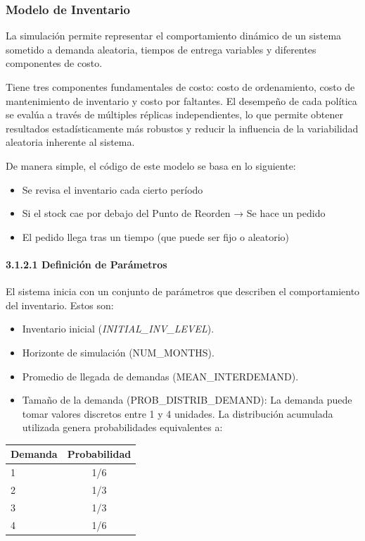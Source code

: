 \documentclass{article}
\begin{document}
\subsubsection{Modelo de Inventario}
La simulación permite representar el comportamiento dinámico de un sistema sometido a demanda aleatoria, tiempos de entrega variables y diferentes componentes de costo.

Tiene tres componentes fundamentales de costo: costo de ordenamiento, costo de mantenimiento de inventario y costo por faltantes. El desempeño de cada política se evalúa a través de múltiples réplicas independientes, lo que permite obtener resultados estadísticamente más robustos y reducir la influencia de la variabilidad aleatoria inherente al sistema.

De manera simple, el código de este modelo se basa en lo siguiente:
\begin{itemize}
    \item Se revisa el inventario cada cierto período
    \item Si el stock cae por debajo del Punto de Reorden → Se hace un pedido
    \item El pedido llega tras un tiempo (que puede ser fijo o aleatorio)
\end{itemize}

\paragraph{3.1.2.1 Definición de Parámetros}
El sistema inicia con un conjunto de parámetros que describen el comportamiento del inventario. Estos son:
\begin{itemize}
    \item Inventario inicial (\textit{INITIAL\_INV\_LEVEL}).
    \item Horizonte de simulación (NUM\_MONTHS).
    \item Promedio de llegada de demandas (MEAN\_INTERDEMAND).
    \item Tamaño de la demanda (PROB\_DISTRIB\_DEMAND): La demanda puede tomar valores discretos entre 1 y 4 unidades. La distribución acumulada utilizada genera probabilidades equivalentes a:
\end{itemize}

\begin{table}[h]
\centering
\begin{tabular}{|l|c|}
\hline
\textbf{Demanda} & \textbf{Probabilidad} \\ \hline
1 & 1/6 \\ \hline
2 & 1/3 \\ \hline
3 & 1/3 \\ \hline
4 & 1/6 \\ \hline
\end{tabular}
\end{table}
\end{document}
